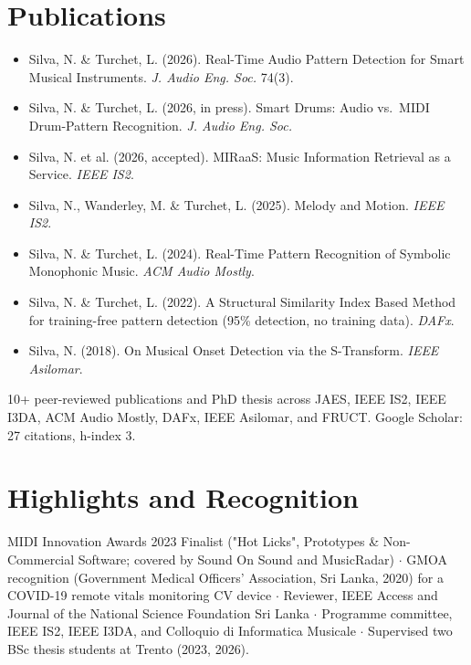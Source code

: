 \documentclass[11pt]{article}
\begin{document}
\section*{Publications}
\begin{itemize}[leftmargin=1.4em, itemsep=-0.2em, topsep=0.1em]
    \item Silva, N. \& Turchet, L. (2026). Real-Time Audio Pattern Detection for Smart Musical Instruments. \textit{J. Audio Eng. Soc.} 74(3).
    \item Silva, N. \& Turchet, L. (2026, in press). Smart Drums: Audio vs.\ MIDI Drum-Pattern Recognition. \textit{J. Audio Eng. Soc.}
    \item Silva, N. et al. (2026, accepted). MIRaaS: Music Information Retrieval as a Service. \textit{IEEE IS2}.
    \item Silva, N., Wanderley, M. \& Turchet, L. (2025). Melody and Motion. \textit{IEEE IS2}.
    \item Silva, N. \& Turchet, L. (2024). Real-Time Pattern Recognition of Symbolic Monophonic Music. \textit{ACM Audio Mostly}.
    \item Silva, N. \& Turchet, L. (2022). A Structural Similarity Index Based Method for training-free pattern detection (95\% detection, no training data). \textit{DAFx}.
    \item Silva, N. (2018). On Musical Onset Detection via the S-Transform. \textit{IEEE Asilomar}.
\end{itemize}
10+ peer-reviewed publications and PhD thesis across JAES, IEEE IS2, IEEE I3DA, ACM Audio Mostly, DAFx, IEEE Asilomar, and FRUCT. Google Scholar: 27 citations, h-index 3.

\section*{Highlights and Recognition}
MIDI Innovation Awards 2023 Finalist ("Hot Licks", Prototypes \& Non-Commercial Software; covered by Sound On Sound and MusicRadar) $\cdot$ GMOA recognition (Government Medical Officers' Association, Sri Lanka, 2020) for a COVID-19 remote vitals monitoring CV device $\cdot$ Reviewer, IEEE Access and Journal of the National Science Foundation Sri Lanka $\cdot$ Programme committee, IEEE IS2, IEEE I3DA, and Colloquio di Informatica Musicale $\cdot$ Supervised two BSc thesis students at Trento (2023, 2026).
\end{document}
